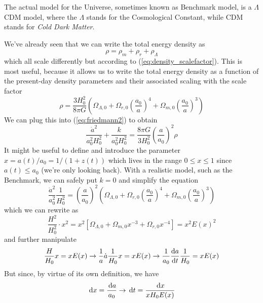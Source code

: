 The actual model for the Universe, sometimes known as Benchmark model, is a $\Lambda$CDM model, where the $\Lambda$ stands for the Cosmological Constant, while CDM stands for \emph{Cold Dark Matter}.
\par We've already seen that we can write the total energy density as
\begin{equation}
    \rho = \rho_{m} + \rho_{r} + \rho_{\Lambda}
\end{equation}
which all scale differently but according to (\ref{eq:density_scalefactor}). This is most useful, because it allows us to write the total energy density as a function of the present-day density parameters and their associated scaling with the scale factor
\begin{equation}
    \rho = \frac{3H_{0}^{2}}{8\pi G}\left(\Omega_{\Lambda,0} + \Omega_{r,0}\left(\frac{a_{0}}{a}\right)^{4} + \Omega_{m,0}\left(\frac{a_{0}}{a}\right)^{3}\right)
\end{equation}
We can plug this into (\ref{eq:friedmann2}) to obtain
\begin{equation}
    \frac{\dot{a}^{2}}{a_{0}^{2}H_{0}^{2}} + \frac{k}{a_{0}^{2}H_{0}^{2}} = \frac{8\pi G}{3H_{0}^{2}}\left(\frac{a}{a_{0}}\right)^{2}\rho
\end{equation}
It might be useful to define and introduce the parameter $x = a(t)/a_{0} = 1/(1+z(t))$ which lives in the range $0 \leq x \leq 1$ since $a(t) \leq a_{0}$ (we're only looking back). With a realistic model, such as the Benchmark, we can safely put $k=0$ and simplify the equation
\begin{equation}
    \frac{\dot{a}^{2}}{a_{0}^{2}}\frac{1}{H_{0}^{2}} = \left(\frac{a}{a_{0}}\right)^{2}\left(\Omega_{\Lambda,0} + \Omega_{r,0}\left(\frac{a_{0}}{a}\right)^{4} + \Omega_{m,0}\left(\frac{a_{0}}{a}\right)^{3}\right)
\end{equation}
which we can rewrite as 
\begin{equation}
    \frac{H^{2}}{H_{0}^{2}}\cdot x^{2} = x^{2}\left[\Omega_{\Lambda,0}+\Omega_{m,0}x^{-3} + \Omega_{r,0}x^{-4}\right] = x^{2}E(x)^{2}
\end{equation}
and further manipulate
\begin{equation}
    \frac{H}{H_{0}}x = xE(x) \to \frac{1}{a}\dot{a}\frac{1}{H_{0}}x = xE(x) \to \frac{1}{a_{0}}\frac{\text{d}a}{\text{d}t}\frac{1}{H_{0}} = xE(x)
\end{equation}
But since, by virtue of its own definition, we have 
\begin{equation}
    \,\text{d}x = \frac{\,\text{d}a}{a_{0}} \to \,\text{d}t = \frac{\,\text{d}x}{xH_{0}E(x)}
\end{equation}

